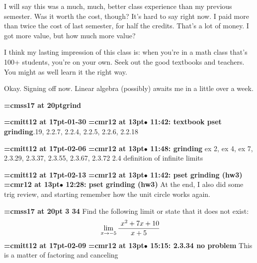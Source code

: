 I will say this was a much, much, better class experience than my previous semester. Was it worth the cost, though? It's hard to say right now. I paid more than twice the cost of last semester, for half the credits. That's a lot of money. I got more value, but how much more value?
\par

I think my lasting impression of this class is: when you're in a math class that's 100+ students, you're on your own. Seek out the good textbooks and teachers. You might as well learn it the right way.
\par

Okay. Signing off now. Linear algebra (possibly) awaits me in a little over a week.
\par

{\medskip\noindent\bf\font\titlefont=cmss17 at 20pt\titlefont grind}\medskip

{\medskip\noindent\bf\font\titlefont=cmitt12 at 17pt-01-30}\medskip
{\smallskip\noindent\bf\font\titlefont=cmr12 at 13pt\titlefont $\bullet$ 11:42: textbook pset grinding}.19, 2.2.7, 2.2.4, 2.2.5, 2.2.6, 2.2.18
\par

{\medskip\noindent\bf\font\titlefont=cmitt12 at 17pt-02-06}\medskip
{\smallskip\noindent\bf\font\titlefont=cmr12 at 13pt\titlefont $\bullet$ 11:48: grinding} ex 2, ex 4, ex 7, 2.3.29, 2.3.37, 2.3.55, 2.3.67, 2.3.72 2.4 definition of infinite limits
\par

{\medskip\noindent\bf\font\titlefont=cmitt12 at 17pt-02-13}\medskip
{\smallskip\noindent\bf\font\titlefont=cmr12 at 13pt\titlefont $\bullet$ 11:42: pset grinding (hw3)}\smallskip
{\smallskip\noindent\bf\font\titlefont=cmr12 at 13pt\titlefont $\bullet$ 12:28: pset grinding (hw3)}\smallskip
At the end, I also did some trig review, and starting remember how the unit circle works again.
\par

{\medskip\noindent\bf\font\titlefont=cmss17 at 20pt 3 34}\medskip
Find the following limit or state that it does not exist:
$$\
\lim_{x \to -5} {\
{x^2 + 7x + 10}
\over
{x + 5}
}
$$
{\medskip\noindent\bf\font\titlefont=cmitt12 at 17pt-02-09}\medskip
{\smallskip\noindent\bf\font\titlefont=cmr12 at 13pt\titlefont $\bullet$ 15:15: 2.3.34 no problem}\smallskip
This is a matter of factoring and canceling
\par

